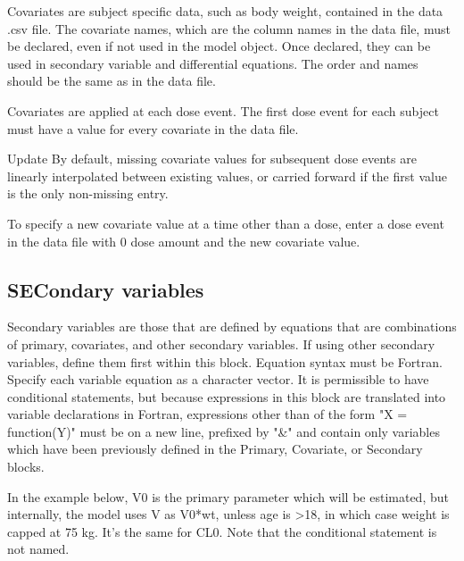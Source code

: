 \documentclass[
]{book}
\newenvironment{Shaded}{\begin{snugshade}}{\end{snugshade}}
\newcommand{\AttributeTok}[1]{\textcolor[rgb]{0.77,0.63,0.00}{#1}}
\newcommand{\FunctionTok}[1]{\textcolor[rgb]{0.00,0.00,0.00}{#1}}
\newcommand{\NormalTok}[1]{#1}
\newcommand{\OtherTok}[1]{\textcolor[rgb]{0.56,0.35,0.01}{#1}}
\newcommand{\SpecialCharTok}[1]{\textcolor[rgb]{0.00,0.00,0.00}{#1}}
\newcommand{\StringTok}[1]{\textcolor[rgb]{0.31,0.60,0.02}{#1}}
\begin{document}
Covariates are subject specific data, such as body weight, contained in
the data .csv file. The covariate names, which are the column names in
the data file, must be declared, even if not used in the model object. Once declared, they can be used in secondary variable
and differential equations. The order and names should be the same as in the data file.

Covariates are applied at each dose event. The first dose event for each
subject must have a value for every covariate in the data file.

{Update} By default, missing covariate values for subsequent dose events are linearly interpolated between existing values, or carried forward if the first value is the only non-missing entry.

To specify a new covariate value at a time other than a dose, enter a dose event in the data file with 0 dose amount and the new covariate value.

\begin{Shaded}
\end{Shaded}

\hypertarget{secR6}{%
\subsection{SECondary variables}\label{secR6}}

Secondary variables are those that are defined by equations that are
combinations of primary, covariates, and other secondary variables. If
using other secondary variables, define them first within this block.
Equation syntax must be Fortran. Specify each variable equation as a character vector. It is permissible to have conditional
statements, but because expressions in this block are translated into
variable declarations in Fortran, expressions other than of the form "X = function(Y)" must be on a new line, prefixed by "\&" and contain only variables which have been previously defined in the Primary, Covariate, or Secondary blocks.

In the example below, V0 is the primary parameter which will be estimated, but internally, the model uses V as V0*wt, unless age is \textgreater18, in which case weight is capped at 75 kg. It's the same for CL0. Note that the conditional statement is not named.
\end{document}
